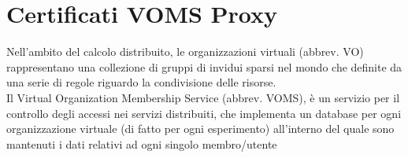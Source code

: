 \section{Certificati VOMS Proxy}
Nell'ambito del calcolo distribuito, le organizzazioni virtuali (abbrev. VO) rappresentano una collezione di gruppi 
di invidui sparsi nel mondo che definite da una serie di regole riguardo la condivisione delle risorse.
\\ Il Virtual Organization Membership Service (abbrev. VOMS), è un servizio per il controllo degli accessi 
nei servizi distribuiti, che implementa
un database per ogni organizzazione virtuale (di fatto per ogni esperimento) all’interno del
quale sono mantenuti i dati relativi ad ogni singolo membro/utente
